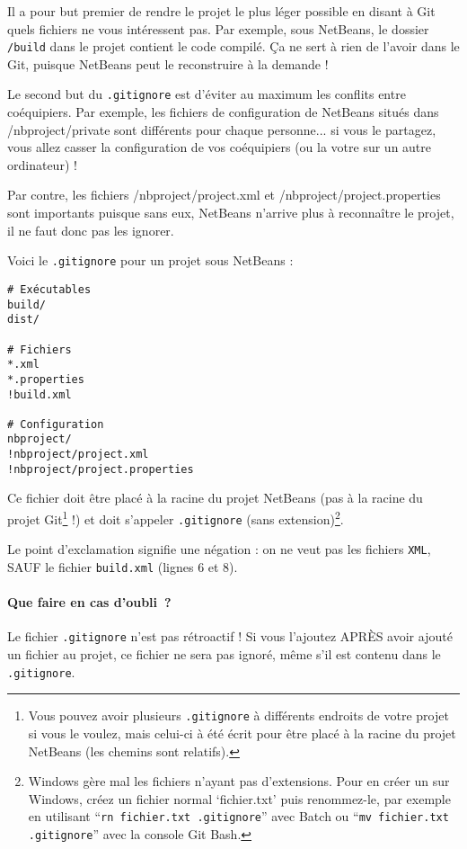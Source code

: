 \documentclass[10pt,a4paper]{article}
\begin{document}
Il a pour but premier de rendre le projet le plus léger possible en disant à Git quels fichiers ne vous intéressent pas. Par exemple, sous NetBeans, le dossier {\tt /build} dans le projet contient le code compilé. Ça ne sert à rien de l'avoir dans le Git, puisque NetBeans peut le reconstruire à la demande !

Le second but du {\tt .gitignore} est d'éviter au maximum les conflits entre coéquipiers. Par exemple, les fichiers de configuration de NetBeans situés dans /nbproject/private sont différents pour chaque personne... si vous le partagez, vous allez casser la configuration de vos coéquipiers (ou la votre sur un autre ordinateur) !

Par contre, les fichiers /nbproject/project.xml et /nbproject/project.properties sont importants puisque sans eux, NetBeans n'arrive plus à reconnaître le projet, il ne faut donc pas les ignorer.

Voici le {\tt .gitignore} pour un projet sous NetBeans :

\begin{verbatim}
# Exécutables
build/
dist/

# Fichiers
*.xml
*.properties
!build.xml

# Configuration
nbproject/
!nbproject/project.xml
!nbproject/project.properties
\end{verbatim}

Ce fichier doit être placé à la racine du projet NetBeans (pas à la racine du projet Git\footnote{Vous pouvez avoir plusieurs {\tt .gitignore} à différents endroits de votre projet si vous le voulez, mais celui-ci à été écrit pour être placé à la racine du projet NetBeans (les chemins sont relatifs).} !) et doit s'appeler {\tt .gitignore} (sans extension)\footnote{Windows gère mal les fichiers n'ayant pas d'extensions. Pour en créer un sur Windows, créez un fichier normal `fichier.txt' puis renommez-le, par exemple en utilisant ``{\tt rn fichier.txt .gitignore}'' avec Batch ou ``{\tt mv fichier.txt .gitignore}'' avec la console Git Bash.}.

Le point d'exclamation signifie une négation : on ne veut pas les fichiers {\tt XML}, SAUF le fichier {\tt build.xml} (lignes 6 et 8).

\paragraph{Que faire en cas d'oubli~?\label{oubli-gitiginore}}

Le fichier {\tt .gitignore} n'est pas rétroactif ! Si vous l'ajoutez APRÈS avoir ajouté un fichier au projet, ce fichier ne sera pas ignoré, même s'il est contenu dans le {\tt .gitignore}.
\end{document}
